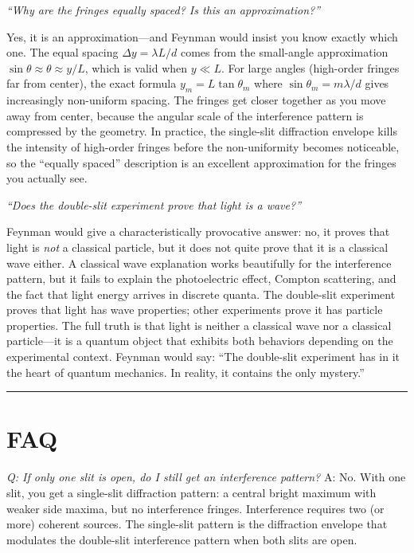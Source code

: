 \textit{``Why are the fringes equally spaced? Is this an approximation?''}

Yes, it is an approximation---and Feynman would insist you know exactly which one. The equal spacing $\Delta y = \lambda L/d$ comes from the small-angle approximation $\sin\theta \approx \theta \approx y/L$, which is valid when $y \ll L$. For large angles (high-order fringes far from center), the exact formula $y_m = L\tan\theta_m$ where $\sin\theta_m = m\lambda/d$ gives increasingly non-uniform spacing. The fringes get closer together as you move away from center, because the angular scale of the interference pattern is compressed by the geometry. In practice, the single-slit diffraction envelope kills the intensity of high-order fringes before the non-uniformity becomes noticeable, so the ``equally spaced'' description is an excellent approximation for the fringes you actually see.

\textit{``Does the double-slit experiment prove that light is a wave?''}

Feynman would give a characteristically provocative answer: no, it proves that light is \emph{not} a classical particle, but it does not quite prove that it is a classical wave either. A classical wave explanation works beautifully for the interference pattern, but it fails to explain the photoelectric effect, Compton scattering, and the fact that light energy arrives in discrete quanta. The double-slit experiment proves that light has wave properties; other experiments prove it has particle properties. The full truth is that light is neither a classical wave nor a classical particle---it is a quantum object that exhibits both behaviors depending on the experimental context. Feynman would say: ``The double-slit experiment has in it the heart of quantum mechanics. In reality, it contains the only mystery.''

\bigskip
\hrule
\bigskip
\section*{FAQ}

\textit{Q: If only one slit is open, do I still get an interference pattern?}
A: No. With one slit, you get a single-slit diffraction pattern: a central bright maximum with weaker side maxima, but no interference fringes. Interference requires two (or more) coherent sources. The single-slit pattern is the diffraction envelope that modulates the double-slit interference pattern when both slits are open.

